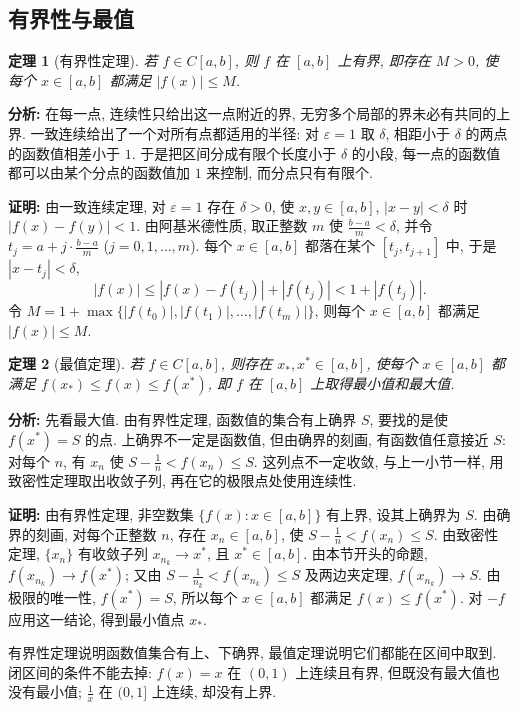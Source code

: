 \documentclass[UTF8,openany]{ctexbook}
\theoremstyle{chinesetextbook}
\newtheorem{theorem}{定理}[section]
\newenvironment{cnproof}{\par\indent\textbf{证明:} \ignorespaces}{\par}
\begin{document}
\subsection{有界性与最值}
\begin{theorem}[有界性定理]
若 $f\in C[a,b]$, 则 $f$ 在 $[a,b]$ 上有界, 即存在 $M>0$, 使每个 $x\in[a,b]$ 都满足 $|f(x)|\le M$.
\end{theorem}
\par\indent\textbf{分析:} 在每一点, 连续性只给出这一点附近的界, 无穷多个局部的界未必有共同的上界. 一致连续给出了一个对所有点都适用的半径: 对 $\varepsilon=1$ 取 $\delta$, 相距小于 $\delta$ 的两点的函数值相差小于 $1$. 于是把区间分成有限个长度小于 $\delta$ 的小段, 每一点的函数值都可以由某个分点的函数值加 $1$ 来控制, 而分点只有有限个.
\begin{cnproof}
由一致连续定理, 对 $\varepsilon=1$ 存在 $\delta>0$, 使 $x,y\in[a,b]$, $|x-y|<\delta$ 时 $|f(x)-f(y)|<1$. 由阿基米德性质, 取正整数 $m$ 使 $\displaystyle\frac{b-a}m<\delta$, 并令 $\displaystyle t_j=a+j\cdot\frac{b-a}m$ ($j=0,1,\ldots,m$). 每个 $x\in[a,b]$ 都落在某个 $[t_j,t_{j+1}]$ 中, 于是 $|x-t_j|<\delta$,
\[
|f(x)|\le|f(x)-f(t_j)|+|f(t_j)|<1+|f(t_j)|.
\]
令 $M=1+\max\{|f(t_0)|,|f(t_1)|,\ldots,|f(t_m)|\}$, 则每个 $x\in[a,b]$ 都满足 $|f(x)|\le M$.
\end{cnproof}
\begin{theorem}[最值定理]
若 $f\in C[a,b]$, 则存在 $x_*,x^*\in[a,b]$, 使每个 $x\in[a,b]$ 都满足 $f(x_*)\le f(x)\le f(x^*)$, 即 $f$ 在 $[a,b]$ 上取得最小值和最大值.
\end{theorem}
\par\indent\textbf{分析:} 先看最大值. 由有界性定理, 函数值的集合有上确界 $S$, 要找的是使 $f(x^*)=S$ 的点. 上确界不一定是函数值, 但由确界的刻画, 有函数值任意接近 $S$: 对每个 $n$, 有 $x_n$ 使 $\displaystyle S-\frac1n<f(x_n)\le S$. 这列点不一定收敛, 与上一小节一样, 用致密性定理取出收敛子列, 再在它的极限点处使用连续性.
\begin{cnproof}
由有界性定理, 非空数集 $\{f(x):x\in[a,b]\}$ 有上界, 设其上确界为 $S$. 由确界的刻画, 对每个正整数 $n$, 存在 $x_n\in[a,b]$, 使 $\displaystyle S-\frac1n<f(x_n)\le S$. 由致密性定理, $\{x_n\}$ 有收敛子列 $x_{n_k}\to x^*$, 且 $x^*\in[a,b]$. 由本节开头的命题, $f(x_{n_k})\to f(x^*)$; 又由 $\displaystyle S-\frac1{n_k}<f(x_{n_k})\le S$ 及两边夹定理, $f(x_{n_k})\to S$. 由极限的唯一性, $f(x^*)=S$, 所以每个 $x\in[a,b]$ 都满足 $f(x)\le f(x^*)$. 对 $-f$ 应用这一结论, 得到最小值点 $x_*$.
\end{cnproof}
有界性定理说明函数值集合有上、下确界, 最值定理说明它们都能在区间中取到. 闭区间的条件不能去掉: $f(x)=x$ 在 $(0,1)$ 上连续且有界, 但既没有最大值也没有最小值; $\displaystyle\frac1x$ 在 $(0,1]$ 上连续, 却没有上界.
\end{document}
